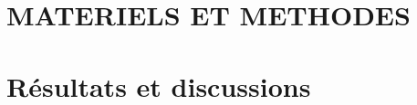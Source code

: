 \documentclass{ifri}
\begin{document}
\chapter{MATERIELS ET METHODES}\label{chap:3}
 

 \chapter{Résultats et discussions}\label{chap:4}
 

% 

% 
\lhead[]{} \rhead[]{} \chead[]{}



% 

\newpage

%

\newpage
\tableofcontents
\end{document}
